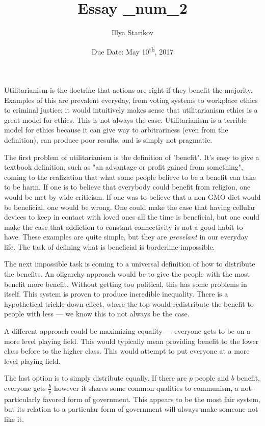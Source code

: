 \documentclass[12pt]{article}
\title{Essay \_num_2}
\date{Due Date: May 10\textsuperscript{th}, 2017}
\author{Illya Starikov}
\newcommand{\source}[1]{\footnote{\url{_num_1}}}
\let\footnote=\endnote
\begin{document}
\maketitle

Utilitarianism is the doctrine that actions are right if they benefit the majority. Examples of this are prevalent everyday, from voting systems to workplace ethics to criminal justice; it would intuitively makes sense that utilitarianism ethics is a great model for ethics. This is not always the case. Utilitarianism is a terrible model for ethics because it can give way to arbitrariness (even from the definition), can produce poor results, and is simply not pragmatic.

The first problem of utilitarianism is the definition of "benefit". It's easy to give a textbook definition, such as "an advantage or profit gained from something"\source{http://www.dictionary.com/browse/benefit}, coming to the realization that what some people believe to be a benefit can take to be harm. If one is to believe that everybody could benefit from religion, one would be met by wide criticism. If one was to believe that a non-GMO diet would be beneficial, one would be wrong. One could make the case that having cellular devices to keep in contact with loved ones all the time is beneficial, but one could make the case that addiction to constant connectivity is not a good habit to have. These examples are quite simple, but they are \textit{prevelant} in our everyday life. The task of defining what is beneficial is borderline impossible.

The next impossible task is coming to a universal definition of how to distribute the benefits. An oligarchy approach would be to give the people with the most benefit more benefit. Without getting too political, this has some problems in itself. This system is proven to produce incredible inequality. There is a hypothetical trickle down effect, where the top would redistribute the benefit to people with less --- we know this to not always be the case.

A different approach could be maximizing equality --- everyone gets to be on a more level playing field. This would typically mean providing benefit to the lower class before to the higher class. This would attempt to put everyone at a more level playing field.

The last option is to simply distribute equally. If there are $p$ people and $b$ benefit, everyone gets $\frac{b}{p}$ however it shares some common qualities to communism, a not-particularly favored form of government. This appears to be the most fair system, but its relation to a particular form of government will always make someone not like it.
\end{document}
